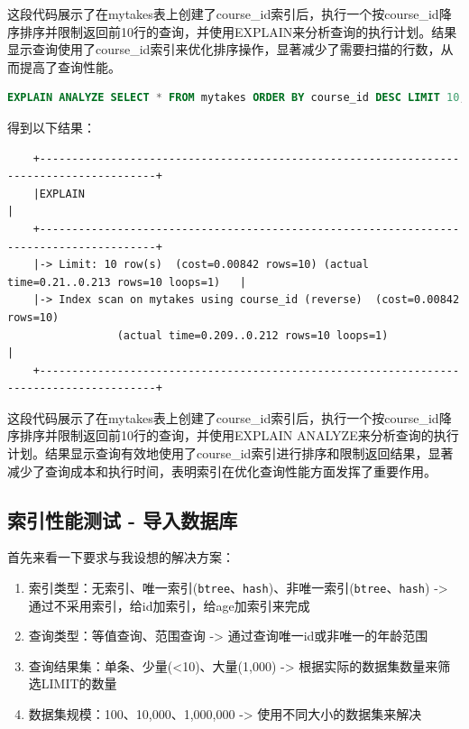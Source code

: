 \documentclass{article}
\begin{document}
	这段代码展示了在mytakes表上创建了course\_id索引后，执行一个按course\_id降序排序并限制返回前10行的查询，并使用EXPLAIN来分析查询的执行计划。结果显示查询使用了course\_id索引来优化排序操作，显著减少了需要扫描的行数，从而提高了查询性能。
	
	\begin{lstlisting}[language=sql, title=索引对查询性能的影响, tabsize=4]
	EXPLAIN ANALYZE SELECT * FROM mytakes ORDER BY course_id DESC LIMIT 10;
	\end{lstlisting}
	
	得到以下结果：
	
	\begin{verbatim}
	+----------------------------------------------------------------------------------------+
	|EXPLAIN                                                                                 |
	+----------------------------------------------------------------------------------------+
	|-> Limit: 10 row(s)  (cost=0.00842 rows=10) (actual time=0.21..0.213 rows=10 loops=1)   |
	|-> Index scan on mytakes using course_id (reverse)  (cost=0.00842 rows=10)
	             (actual time=0.209..0.212 rows=10 loops=1)                                  |
	+----------------------------------------------------------------------------------------+
	\end{verbatim}
	
	这段代码展示了在mytakes表上创建了course\_id索引后，执行一个按course\_id降序排序并限制返回前10行的查询，并使用EXPLAIN ANALYZE来分析查询的执行计划。结果显示查询有效地使用了course\_id索引进行排序和限制返回结果，显著减少了查询成本和执行时间，表明索引在优化查询性能方面发挥了重要作用。
	
	\subsection{索引性能测试 - 导入数据库}
	
	首先来看一下要求与我设想的解决方案：
	
	\begin{tcolorbox}[title = {要求与方案}, colback = blue!25!white, colframe = blue!75!black]
		\begin{enumerate}
			\item 索引类型：无索引、唯一索引(\texttt{btree}、\texttt{hash})、非唯一索引(\texttt{btree}、\texttt{hash}) -> 通过不采用索引，给id加索引，给age加索引来完成
			\item 查询类型：等值查询、范围查询 -> 通过查询唯一id或非唯一的年龄范围
			\item 查询结果集：单条、少量(<10)、大量(1,000) -> 根据实际的数据集数量来筛选LIMIT的数量
			\item 数据集规模：100、10,000、1,000,000 -> 使用不同大小的数据集来解决
		\end{enumerate}
	\end{tcolorbox}
	
\end{document}
